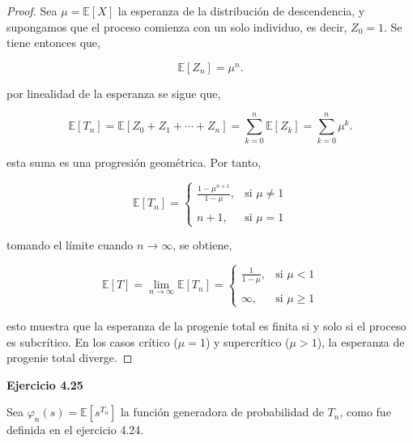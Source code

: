 \documentclass{article}
\begin{document}
\begin{proof}
Sea \( \mu = \mathbb{E}[X] \) la esperanza de la distribución de descendencia, y supongamos que el proceso comienza con un solo individuo, es decir, \( Z_0 = 1 \). Se tiene entonces que,

\[
\mathbb{E}[Z_n] = \mu^n.
\]

por linealidad de la esperanza se sigue que,

\[
\mathbb{E}[T_n] = \mathbb{E}[Z_0 + Z_1 + \cdots + Z_n] = \sum_{k=0}^n \mathbb{E}[Z_k] = \sum_{k=0}^n \mu^k.
\]

esta suma es una progresión geométrica. Por tanto,

\[
\mathbb{E}[T_n] = 
\begin{cases}
\frac{1 - \mu^{n+1}}{1 - \mu}, & \text{si } \mu \neq 1 \\\\
n + 1, & \text{si } \mu = 1
\end{cases}
\]

tomando el límite cuando \( n \to \infty \), se obtiene,

\[
\mathbb{E}[T] = \lim_{n \to \infty} \mathbb{E}[T_n] = 
\begin{cases}
\frac{1}{1 - \mu}, & \text{si } \mu < 1 \\\\
\infty, & \text{si } \mu \geq 1
\end{cases}
\]

esto muestra que la esperanza de la progenie total es finita si y solo si el proceso es subcrítico. En los casos crítico (\( \mu = 1 \)) y supercrítico (\( \mu > 1 \)), la esperanza de progenie total diverge.

\end{proof}




\textbf{Ejercicio 4.25}

Sea \( \varphi_n(s) = \mathbb{E}[s^{T_n}] \) la función generadora de probabilidad de \( T_n \), como fue definida en el ejercicio 4.24.
\end{document}

